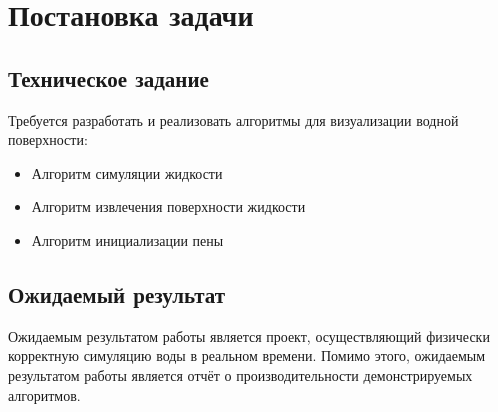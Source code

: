 \chapter{Постановка задачи} \label{ch1}


\section{Техническое задание} \label{ch1:sec1}

Требуется разработать и реализовать алгоритмы для визуализации водной
поверхности:
\begin{itemize}
	\item Алгоритм симуляции жидкости
	\item Алгоритм извлечения поверхности жидкости
	\item Алгоритм инициализации пены
\end{itemize}


\section{Ожидаемый результат} \label{ch1:sec2}

Ожидаемым результатом работы является проект, осуществляющий физически
корректную симуляцию воды в реальном времени. Помимо этого, ожидаемым
результатом работы является отчёт о производительности демонстрируемых
алгоритмов.
